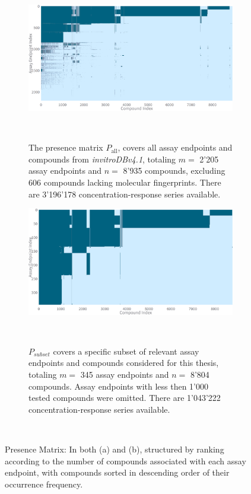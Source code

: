 \begin{figure}
    \centering
    \begin{subfigure}[b]{0.48\textwidth}
        \centering
        \includegraphics[width=\textwidth]{figures/presence_matrix_all.png}
        \caption{The presence matrix $P_{\text{all}}$, covers all assay endpoints and compounds from \emph{invitroDBv4.1}, totaling $m =$ 2'205 assay endpoints and $n =$ 8'935 compounds, excluding 606 compounds lacking molecular fingerprints. There are 3'196'178 concentration-response series available.}
    ~\label{fig:presence_matrix_all}
    \end{subfigure}
    \hfill
    \begin{subfigure}[b]{0.48\textwidth}
        \centering
        \includegraphics[width=\textwidth]{figures/presence_matrix_subset.png}
        \caption{$P_{subset}$ covers a specific subset of relevant assay endpoints and compounds considered for this thesis, totaling $m =$ 345 assay endpoints and $n =$ 8'804 compounds. Assay endpoints with less then 1'000 tested compounds were omitted. There are 1'043'222 concentration-response series available.}
        ~\label{fig:presence_matrix_subset}
    \end{subfigure}
    \caption{Presence Matrix: In both (a) and (b), structured by ranking according to the number of compounds associated with each assay endpoint, with compounds sorted in descending order
    of their occurrence frequency.}
    ~\label{fig:presence_matrix}
\end{figure}

